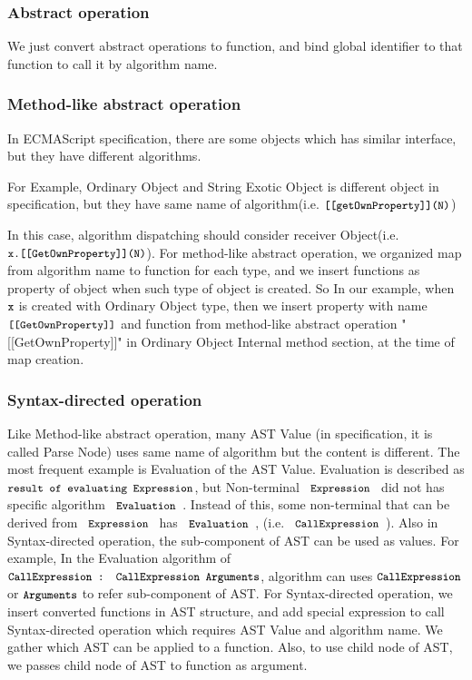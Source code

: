\subsubsection{Abstract operation}

We just convert abstract operations to function, and bind global identifier to that function to call it by algorithm name.

\subsubsection{Method-like abstract operation}

In ECMAScript specification, there are some objects which has similar interface, but they have different algorithms. 

For Example, Ordinary Object and String Exotic Object is different object in specification, but they have same name of algorithm(i.e. \( \texttt{\small[[getOwnProperty]](N)} \))

In this case, algorithm dispatching should consider receiver Object(i.e. \( \texttt{\small x.[[GetOwnProperty]](N)} \)).
For method-like abstract operation, we organized map from algorithm name to function for each type,
 and we insert functions as property of object when such type of object is created. So In our example, when  \( \texttt{\small x} \) is created with Ordinary Object type,
 then we insert property with name \( \texttt{\small[[GetOwnProperty]]} \) and function from method-like abstract operation "[[GetOwnProperty]]" in Ordinary Object Internal method section, at the time of map creation.

 \subsubsection{Syntax-directed operation}
 
 Like Method-like abstract operation, many AST Value (in specification, it is called Parse Node) uses same name of algorithm but the content is different.
The most frequent example is Evaluation of the AST Value. Evaluation is described as \( \texttt{\small result of evaluating Expression} \), but Non-terminal
\( \code{ Expression } \) did not has specific algorithm \( \code{ Evaluation } \). Instead of this, some non-terminal that can be derived from \( \code{ Expression } \) has \( \code{ Evaluation }\),
(i.e. \( \code{ CallExpression } \)). Also in Syntax-directed operation, the sub-component of AST can be used as values. For example, In the
Evaluation algorithm of\\ \( \texttt{\small CallExpression : CallExpression Arguments} \), algorithm can uses \( \code{CallExpression}\) or \( \texttt{\small Arguments}\) to refer sub-component of AST.
 For Syntax-directed operation, we insert converted functions in AST structure, and add special expression to call Syntax-directed operation which requires AST Value and algorithm name.
We gather which AST can be applied to a function. Also, to use child node of AST, we passes child node of AST to function as argument.

